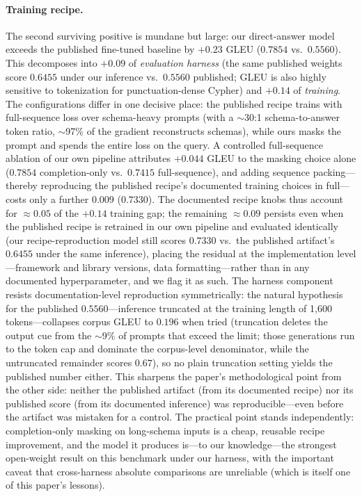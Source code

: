 \documentclass[11pt]{article}
\begin{document}
\paragraph{Training recipe.} The second surviving positive is mundane but large: our direct-answer
model exceeds the published fine-tuned baseline by $+0.23$ GLEU ($0.7854$ vs.\ $0.5560$). This
decomposes into $+0.09$ of \emph{evaluation harness} (the same published weights score $0.6455$
under our inference vs.\ $0.5560$ published; GLEU is also highly sensitive to tokenization for
punctuation-dense Cypher) and $+0.14$ of \emph{training}. The
configurations differ in one decisive place: the published recipe trains with full-sequence loss over
schema-heavy prompts (with a $\sim$30:1 schema-to-answer token ratio, $\sim$97\% of the gradient
reconstructs schemas), while ours masks the prompt and spends the entire loss on the query. A
controlled full-sequence ablation of our own pipeline attributes $+0.044$ GLEU to the masking choice
alone ($0.7854$ completion-only vs.\ $0.7415$ full-sequence), and adding sequence packing---thereby
reproducing the published recipe's documented training choices in full---costs only a further
$0.009$ ($0.7330$). The documented recipe knobs thus account for $\approx0.05$ of the $+0.14$
training gap; the remaining $\approx0.09$ persists even when the published recipe is retrained in
our own pipeline and evaluated identically (our recipe-reproduction model still scores $0.7330$
vs.\ the published artifact's $0.6455$ under the same inference), placing the residual at the
implementation level---framework and library versions, data formatting---rather than in any
documented hyperparameter, and we flag it as such. The harness component resists
documentation-level reproduction symmetrically: the natural hypothesis for the published
$0.5560$---inference truncated at the training length of 1{,}600 tokens---collapses corpus GLEU to
$0.196$ when tried (truncation deletes the output cue from the $\sim$9\% of prompts that exceed the
limit; those generations run to the token cap and dominate the corpus-level denominator, while the
untruncated remainder scores $0.67$), so no plain truncation setting yields the published number
either. This sharpens the paper's methodological point from the other side: neither the published
artifact (from its documented recipe) nor its published score (from its documented inference) was
reproducible---even before the artifact was mistaken for a control. The practical point
stands independently: completion-only masking on long-schema inputs is a cheap, reusable recipe
improvement, and the model it produces is---to our knowledge---the strongest open-weight result on
this benchmark under our harness, with the important caveat that cross-harness absolute comparisons
are unreliable (which is itself one of this paper's lessons).
\end{document}
